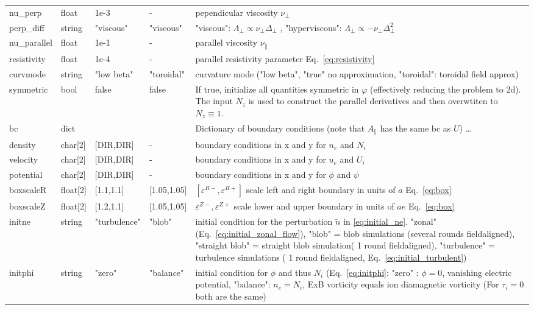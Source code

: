 \begin{longtable}{llll>{\RaggedRight}p{6cm}}
nu\_perp   & float &1e-3   & - & pependicular viscosity $\nu_\perp$ \\
perp\_diff & string & "viscous" & "viscous" & "viscous": $\Lambda_\perp\propto \nu_\perp\Delta_\perp$ , "hyperviscous": $\Lambda_\perp \propto -\nu_\perp\Delta_\perp^2$\\
nu\_parallel & float &1e-1 & - & parallel viscosity $\nu_\parallel$ \\
resistivity & float &1e-4  & - & parallel resistivity parameter Eq.~\eqref{eq:resistivity}\\
curvmode  & string & "low beta"  & "toroidal"& curvature mode ("low beta", "true" no approximation, "toroidal": toroidal field approx) \\
symmetric & bool & false & false & If true, initialize all quantities symmetric in $\varphi$ (effectively reducing the problem to 2d). The input $N_z$ is used to construct the parallel derivatives and then overwtiten to $N_z\equiv 1$. \\
bc & dict & & & Dictionary of boundary conditions (note that $A_\parallel$ has the same bc as $U$) \ldots\\
\qquad density   & char[2] & [DIR,DIR] & -  & boundary conditions in x and y for $n_e$ and $N_i$\\
\qquad velocity  & char[2] & [DIR,DIR] & - & boundary conditions in x and y for $u_e$ and $U_i$\\
\qquad potential & char[2] & [DIR,DIR] & - & boundary conditions in x and y for $\phi$ and $\psi$\\
    boxscaleR  & float[2] & [1.1,1.1]     & [1.05,1.05] & $[\varepsilon^{R-}, \varepsilon^{R+}]$ scale left and right boundary in units of $a$ Eq.~\eqref{eq:box}\\
    boxscaleZ  & float[2] & [1.2,1.1]     & [1.05,1.05] & $\varepsilon^{Z-}, \varepsilon^{Z+}$ scale lower and upper boundary in units of $ae$ Eq.~\eqref{eq:box} \\
initne    & string & "turbulence"     & "blob"  & initial condition for the
perturbation $\tilde n$ in \eqref{eq:initial_ne}. "zonal" (Eq.~\eqref{eq:initial_zonal_flow}),
    "blob" = blob simulations (several rounds fieldaligned),
    "straight blob" = straight blob simulation( 1 round fieldaligned),
    "turbulence" = turbulence simulations ( 1 round fieldaligned, Eq.~\eqref{eq:initial_turbulent})\\
initphi   & string & "zero"  & "balance" & initial condition for $\phi$ and thus $N_i$ (Eq.~\eqref{eq:initphi}: "zero" : $\phi = 0$, vanishing
electric potential, "balance": $n_e=N_i$, ExB vorticity equals ion diamagnetic vorticity (For $\tau_i =0 $ both are the same)

\end{longtable}
